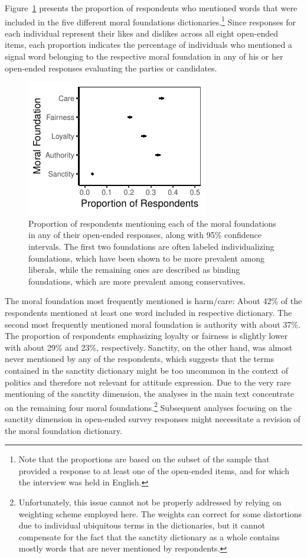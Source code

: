 \documentclass[12pt]{article}
\begin{document}
Figure~\ref{fig:prop_ideol} presents the proportion of respondents who mentioned words that were included in the five different moral foundations dictionaries.\footnote{Note that the proportions are based on the subset of the sample that provided a response to at least one of the open-ended items, and for which the interview was held in English.} Since responses for each individual represent their likes and dislikes across all eight open-ended items, each proportion indicates the percentage of individuals who mentioned a signal word belonging to the respective moral foundation in any of his or her open-ended responses evaluating the parties or candidates.

\begin{figure}[ht]\centering
\includegraphics{../calc/fig/prop_mft.pdf}
\caption{Proportion of respondents mentioning each of the moral foundations in any of their open-ended responses, along with 95\% confidence intervals. The first two foundations are often labeled individualizing foundations, which have been shown to be more prevalent among liberals, while the remaining ones are described as binding foundations, which are more prevalent among conservatives.}\label{fig:prop_ideol}
\end{figure}

The moral foundation most frequently mentioned is harm/care: About 42\% of the respondents mentioned at least one word included in respective dictionary. The second most frequently mentioned moral foundation is authority with about 37\%. The proportion of respondents emphasizing loyalty or fairness is slightly lower with about 29\% and 23\%, respectively. Sanctity, on the other hand, was almost never mentioned by any of the respondents, which suggests that the terms contained in the sanctity dictionary might be too uncommon in the context of politics and therefore not relevant for attitude expression. Due to the very rare mentioning of the sanctity dimension, the analyses in the main text concentrate on the remaining four moral foundations.\footnote{Unfortunately, this issue cannot not be properly addressed by relying on weighting scheme employed here. The weights can correct for some distortions due to individual ubiquitous terms in the dictionaries, but it cannot compensate for the fact that the sanctity dictionary as a whole contains mostly words that are never mentioned by respondents.} Subsequent analyses focusing on the sanctity dimension in open-ended survey responses might necessitate a revision of the moral foundation dictionary.
\end{document}
